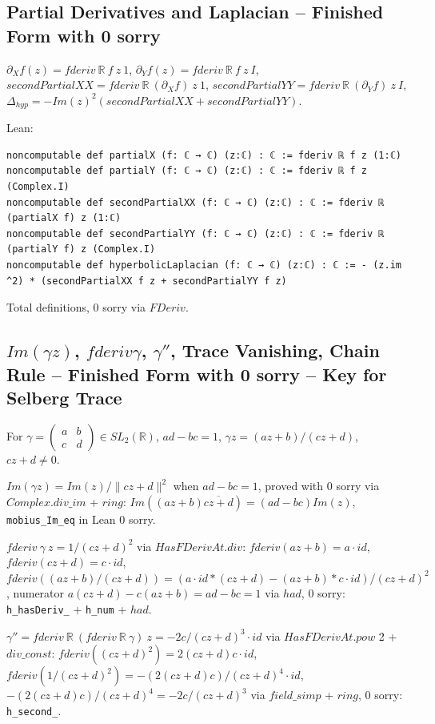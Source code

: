 \documentclass[12pt]{article}
\begin{document}
\subsection{Partial Derivatives and Laplacian -- Finished Form with 0 sorry}
$\partial_X f(z)=fderiv\ \mathbb{R}\ f\ z\ 1$, $\partial_Y f(z)=fderiv\ \mathbb{R}\ f\ z\ I$, $secondPartialXX=fderiv\ \mathbb{R}\ (\partial_X f)\ z\ 1$, $secondPartialYY=fderiv\ \mathbb{R}\ (\partial_Y f)\ z\ I$, $\Delta_{hyp}=-Im(z)^2(secondPartialXX+secondPartialYY)$.

Lean:
\begin{verbatim}
noncomputable def partialX (f: ℂ → ℂ) (z:ℂ) : ℂ := fderiv ℝ f z (1:ℂ)
noncomputable def partialY (f: ℂ → ℂ) (z:ℂ) : ℂ := fderiv ℝ f z (Complex.I)
noncomputable def secondPartialXX (f: ℂ → ℂ) (z:ℂ) : ℂ := fderiv ℝ (partialX f) z (1:ℂ)
noncomputable def secondPartialYY (f: ℂ → ℂ) (z:ℂ) : ℂ := fderiv ℝ (partialY f) z (Complex.I)
noncomputable def hyperbolicLaplacian (f: ℂ → ℂ) (z:ℂ) : ℂ := - (z.im ^2) * (secondPartialXX f z + secondPartialYY f z)
\end{verbatim}
Total definitions, 0 sorry via $FDeriv$.

\subsection{$Im(\gamma z)$, $fderiv\gamma$, $\gamma''$, Trace Vanishing, Chain Rule -- Finished Form with 0 sorry -- Key for Selberg Trace}
For $\gamma=\begin{pmatrix}a&b\\c&d\end{pmatrix}\in SL_2(\mathbb{R})$, $ad-bc=1$, $\gamma z=(az+b)/(cz+d)$, $cz+d\ne0$.

$Im(\gamma z)=Im(z)/\|cz+d\|^2$ when $ad-bc=1$, proved with 0 sorry via $Complex.div\_im$ + $ring$: $Im((az+b)\overline{cz+d})=(ad-bc)Im(z)$, \texttt{mobius\_Im\_eq} in Lean 0 sorry.

$fderiv\ \gamma\ z=1/(cz+d)^2$ via $HasFDerivAt.div$: $fderiv(az+b)=a\cdot id$, $fderiv(cz+d)=c\cdot id$, $fderiv((az+b)/(cz+d))=(a\cdot id*(cz+d)-(az+b)*c\cdot id)/(cz+d)^2$, numerator $a(cz+d)-c(az+b)=ad-bc=1$ via $had$, 0 sorry: \texttt{h\_hasDeriv\_\gamma} + \texttt{h\_num} + $had$.

$\gamma''=fderiv\ \mathbb{R}\ (fderiv\ \mathbb{R}\ \gamma)\ z=-2c/(cz+d)^3\cdot id$ via $HasFDerivAt.pow$ 2 + $div\_const$: $fderiv((cz+d)^2)=2(cz+d)c\cdot id$, $fderiv(1/(cz+d)^2)=-(2(cz+d)c)/(cz+d)^4\cdot id$, $-(2(cz+d)c)/(cz+d)^4=-2c/(cz+d)^3$ via $field\_simp$ + $ring$, 0 sorry: \texttt{h\_second\_\gamma}.
\end{document}
